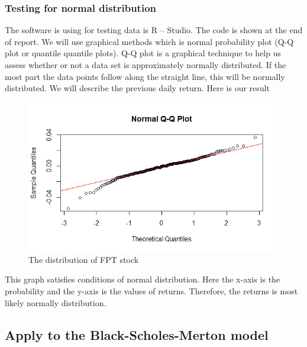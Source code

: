 \subsubsection*{Testing for normal distribution}
The software is using for testing data is R – Studio. The code is shown at the end of report. We will use graphical methods which is normal probability plot (Q-Q plot or quantile quantile plots).
Q-Q plot is a graphical technique to help us assess whether or not a data set is approximately normally distributed. %
If the most part the data points follow along the straight line, this will be normally distributed. We will describe the previous daily return.  Here is our result
\begin{figure}[htp]
	\begin{center}
		\includegraphics[scale=.8]{Rplot03}
	\end{center}
	\label{refRplot03}
	\caption{The distribution of FPT stock}
\end{figure}

\newpage
This graph satisfies conditions of normal distribution. Here the x-axis is the probability and the y-axis is the values of returns.
Therefore, the returns is most likely normally distribution.
\subsection{Apply to the Black-Scholes-Merton model}

